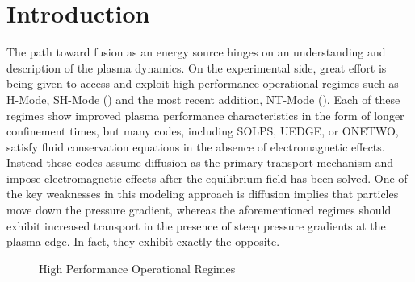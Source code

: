 \section{Introduction} \label{sec:Introduction}

The path toward fusion as an energy source hinges on an understanding and description of the plasma dynamics. On the experimental side, great effort is being given to access and exploit high performance operational regimes such as \gls{H-Mode}\cite{Loarte2011}, \gls{SH-Mode}\cite{Knolker2020} () and the most recent addition, \gls{NT-Mode}\cite{Marinoni2020, Medvedev2015} (). Each of these regimes show improved plasma performance characteristics in the form of longer confinement times, but many codes, including SOLPS, UEDGE, or ONETWO, satisfy fluid conservation equations in the absence of electromagnetic effects. Instead these codes assume diffusion as the primary transport mechanism and impose electromagnetic effects after the equilibrium field has been solved. One of the key weaknesses in this modeling approach is diffusion implies that particles move down the pressure gradient, whereas the aforementioned regimes should exhibit increased transport in the presence of steep pressure gradients at the plasma edge. In fact, they exhibit exactly the opposite.

\begin{figure}[!ht]
	 \quad
	\caption{High Performance Operational Regimes}
\end{figure}

